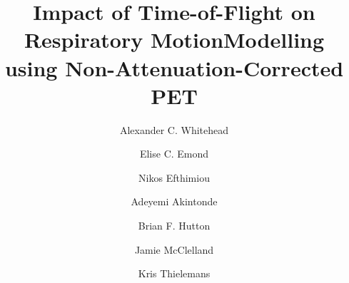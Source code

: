 \documentclass[portrait,color=UCLburgundy,margin=2cm]{uclposter}
\begin{document}
\title{Impact of Time-of-Flight on Respiratory Motion\newline Modelling using Non-Attenuation-Corrected PET}

\author[1,2 *]{Alexander C. Whitehead}
\author[1]{Elise C. Emond}
\author[3]{Nikos Efthimiou}
\author[1,2]{Adeyemi Akintonde}
\author[1]{Brian F. Hutton}
\author[2]{\newline Jamie McClelland}
\author[1]{Kris Thielemans}


\maketitle

\linespread{1.1}
\end{document}
